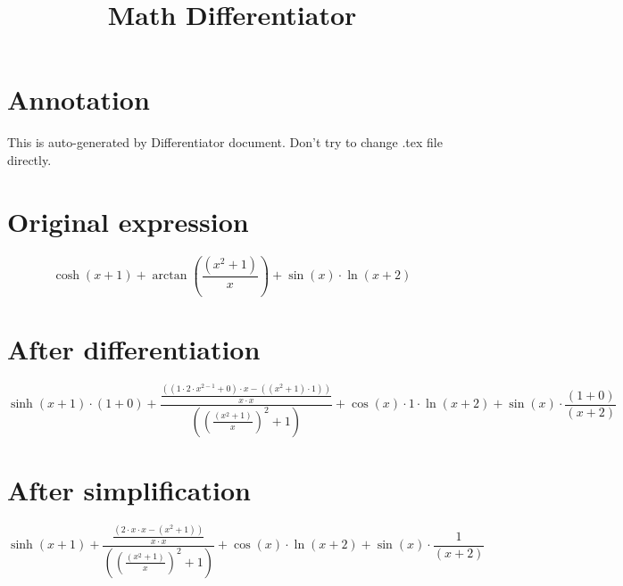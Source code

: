 \documentclass[a4paper,12pt]{article}
\title{\textbf{Math Differentiator}}
\date{}
\author{\text{Kaplin Artyom, B01-402}}
\begin{document}
\maketitle

\section*{Annotation}
This is auto-generated by Differentiator document. Don't try to change .tex file directly.

\section*{Original expression}

\[\cosh{\left({x}{+}{1}\right)}{+}\arctan{\left(\frac{\left({x}^{{2}}{+}{1}\right)}{{x}}\right)}{+}\sin{\left({x}\right)}{\cdot}\ln{\left({x}{+}{2}\right)}\]

\section*{After differentiation}

\[\sinh{\left({x}{+}{1}\right)}{\cdot}\left({1}{+}{0}\right){+}\frac{\frac{\left(\left({1}{\cdot}{2}{\cdot}{x}^{{2}{-}{1}}{+}{0}\right){\cdot}{x}{-}\left(\left({x}^{{2}}{+}{1}\right){\cdot}{1}\right)\right)}{{x}{\cdot}{x}}}{\left(\left(\frac{\left({x}^{{2}}{+}{1}\right)}{{x}}\right)^{{2}}{+}{1}\right)}{+}\cos{\left({x}\right)}{\cdot}{1}{\cdot}\ln{\left({x}{+}{2}\right)}{+}\sin{\left({x}\right)}{\cdot}\frac{\left({1}{+}{0}\right)}{\left({x}{+}{2}\right)}\]

\section*{After simplification}

\[\sinh{\left({x}{+}{1}\right)}{+}\frac{\frac{\left({2}{\cdot}{x}{\cdot}{x}{-}\left({x}^{{2}}{+}{1}\right)\right)}{{x}{\cdot}{x}}}{\left(\left(\frac{\left({x}^{{2}}{+}{1}\right)}{{x}}\right)^{{2}}{+}{1}\right)}{+}\cos{\left({x}\right)}{\cdot}\ln{\left({x}{+}{2}\right)}{+}\sin{\left({x}\right)}{\cdot}\frac{{1}}{\left({x}{+}{2}\right)}\]
\end{document}
